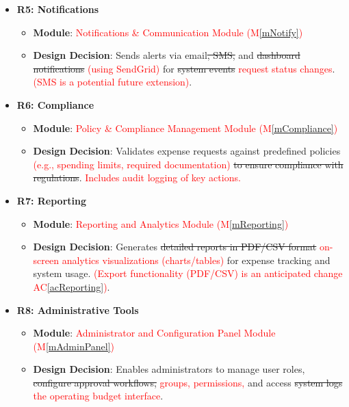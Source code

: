 \documentclass[12pt, titlepage]{article}
\newcommand{\acref}[1]{AC\ref{#1}}
\newcommand{\mref}[1]{M\ref{#1}}
\begin{document}
\begin{itemize}
    \item \textbf{R5: Notifications}
    \begin{itemize}
        \item \textbf{Module}: \textcolor{red}{Notifications \& Communication Module (\mref{mNotify})}
        \item \textbf{Design Decision}: Sends alerts via email\sout{, SMS,} and \sout{dashboard notifications} \textcolor{red}{(using SendGrid)} for \sout{system events} \textcolor{red}{request status changes}. \textcolor{red}{(SMS is a potential future extension)}.
    \end{itemize}

    \item \textbf{R6: Compliance}
    \begin{itemize}
        \item \textbf{Module}: \textcolor{red}{Policy \& Compliance Management Module (\mref{mCompliance})}
        \item \textbf{Design Decision}: Validates expense requests against predefined policies \textcolor{red}{(e.g., spending limits, required documentation)} \sout{to ensure compliance with regulations}. \textcolor{red}{Includes audit logging of key actions.}
    \end{itemize}

    \item \textbf{R7: Reporting}
    \begin{itemize}
        \item \textbf{Module}: \textcolor{red}{Reporting and Analytics Module (\mref{mReporting})}
        \item \textbf{Design Decision}: Generates \sout{detailed reports in PDF/CSV format} \textcolor{red}{on-screen analytics visualizations (charts/tables)} for expense tracking and system usage. \textcolor{red}{(Export functionality (PDF/CSV) is an anticipated change \acref{acReporting})}.
    \end{itemize}

    \item \textbf{R8: Administrative Tools}
    \begin{itemize}
        \item \textbf{Module}: \textcolor{red}{Administrator and Configuration Panel Module (\mref{mAdminPanel})}
        \item \textbf{Design Decision}: Enables administrators to manage user roles, \sout{configure approval workflows,} \textcolor{red}{groups, permissions,} and access \sout{system logs} \textcolor{red}{the operating budget interface}.
    \end{itemize}
\end{itemize}
\end{document}
